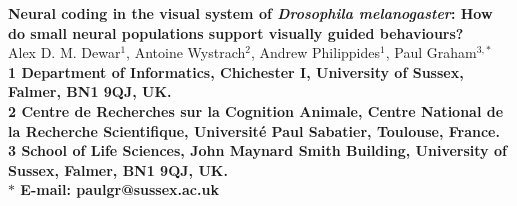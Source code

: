 \date{}

\pagestyle{myheadings}



\usepackage{verbatim} %

\usepackage[utf8]{inputenc}

\usepackage{gensymb} %



\begin{flushleft}
{\Large
\textbf{Neural coding in the visual system of \emph{Drosophila melanogaster}: How do small neural populations support visually guided behaviours?}
}
\\
Alex D. M. Dewar$^{1}$,
Antoine Wystrach$^{2}$,
Andrew Philippides$^{1}$,
Paul Graham$^{3,\ast}$
\\
\bf{1} Department of Informatics, Chichester I, University of Sussex, Falmer, BN1 9QJ, UK.
\\
\bf{2} Centre de Recherches sur la Cognition Animale, Centre National de la Recherche Scientifique, Université Paul Sabatier, Toulouse, France.
\\
\bf{3} School of Life Sciences, John Maynard Smith Building, University of Sussex, Falmer, BN1 9QJ, UK.
\\
$\ast$ E-mail: paulgr@sussex.ac.uk
\end{flushleft}

